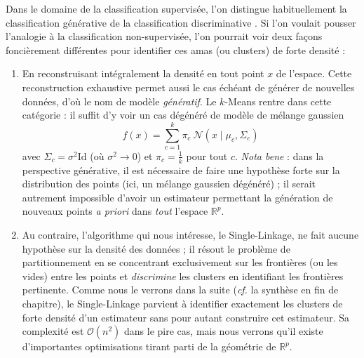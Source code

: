 Dans le domaine de la classification {supervisée}, l'on distingue habituellement la classification générative de la classification discriminative \cite{NgJordan2001}.
Si l'on voulait pousser l'analogie à la classification non-supervisée, l'on pourrait voir deux façons foncièrement différentes pour identifier ces amas (ou clusters) de forte densité :
\begin{enumerate}
\item En reconstruisant intégralement la densité en tout point $x$ de l'espace. Cette reconstruction exhaustive permet aussi le cas échéant de générer de nouvelles données, d'où le nom de modèle \emph{génératif}. Le $k$-{Means} rentre dans cette catégorie : il suffit d'y voir un cas dégénéré de modèle de mélange gaussien \cite{GaussianMixture}
\[ 
    f(x) = \sum_{c=1}^k \pi_c \ \mathcal{N}(x \mid \mu_c, \Sigma_c)
\]
avec $\Sigma_c = \sigma^2 \mathrm{Id}$ (où $\sigma^2 \to 0$) et $\pi_c = \frac{1}{k}$ pour tout $c$. 
\emph{Nota bene} : dans la perspective générative, il est nécessaire de faire une hypothèse forte sur la distribution des points (ici, un mélange gaussien dégénéré) ; il serait autrement impossible d'avoir un estimateur permettant la génération de nouveaux points \emph{a priori} dans \emph{tout} l'espace $\mathbb R^p$.
\item Au contraire, l'algorithme qui nous intéresse, le Single-Linkage, ne fait aucune hypothèse sur la densité des données ; il résout le problème de partitionnement en se concentrant exclusivement sur les frontières (ou les vides) entre les points et \emph{discrimine} les clusters en identifiant les frontières pertinente. 
Comme nous le verrons dans la suite (\emph{cf.} la synthèse en fin de chapitre), le Single-Linkage parvient à identifier exactement les clusters de forte densité d'un estimateur sans pour autant construire cet estimateur.
Sa complexité est $\mathcal{O}(n^2)$ dans le pire cas, mais nous verrons qu'il existe d'importantes optimisations tirant parti de la géométrie de $\mathbb R^p$.
\end{enumerate}



